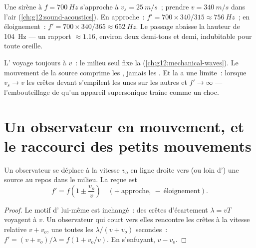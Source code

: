 \begin{example}\label{ex:g12:doppler-effect:siren}
Une sirène à $f = \qty{700}{Hz}$ s'approche à $v_s = \qty{25}{m/s}$~;
prendre $v = \qty{340}{m/s}$ dans l'air (\cref{ch:g12:sound-acoustics}).
En approche~: $f' = 700 \times 340/315 \approx \qty{756}{Hz}$~; en
éloignement~: $f' = 700 \times 340/365 \approx \qty{652}{Hz}$. Le
passage abaisse la hauteur de \qty{104}{Hz} --- un
rapport $\approx 1.16$, environ deux demi-tons et demi, indubitable
pour toute oreille.
\end{example}

\begin{remark}\label{rem:g12:doppler-effect:speed-unchanged}
L' voyage toujours à $v$~: le milieu seul fixe la 
(\cref{ch:g12:mechanical-waves}). Le mouvement de la source comprime
les \emph{}, jamais les . Et la
 a une limite~: lorsque $v_s \to v$ les crêtes devant
s'empilent les unes sur les autres et $f' \to \infty$ --- l'embouteillage
de  qu'un appareil supersonique traîne comme un
choc.
\end{remark}

\section{Un observateur en mouvement, et le raccourci des petits mouvements}

\begin{proposition}\label{prop:g12:doppler-effect:moving-observer}
Un observateur se déplace à la vitesse $v_o$ en ligne droite vers
(ou loin d') une source au repos dans le milieu. La
 reçue est
\[ f' = f\left(1 \pm \frac{v_o}{v}\right) \quad (+\ \text{approche},\ -\ \text{éloignement}). \]
\end{proposition}

\begin{proof}
Le motif d' lui-même est inchangé~: des crêtes d'écartement
$\lambda = vT$ voyagent à $v$. Un observateur qui court vers elles
rencontre les crêtes à la vitesse relative $v + v_o$, une toutes les
$\lambda/(v + v_o)$ secondes~: $f' = (v + v_o)/\lambda = f(1 + v_o/v)$.
En s'enfuyant, $v - v_o$.
\end{proof}


